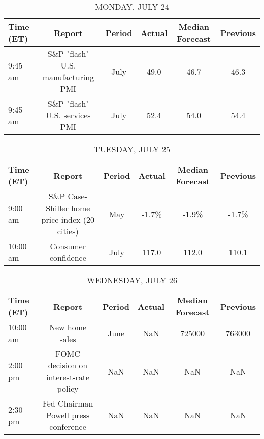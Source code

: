 \documentclass{article}%
\begin{document}
%
\normalsize%


\begin{table}[htbp]%
\caption{MONDAY, JULY 24}%
\centering%
\begin{adjustbox}{width=1\textwidth}%
\begin{tabular}{lccccc}
\toprule
Time (ET) &                             Report & Period & Actual & Median Forecast & Previous \\
\midrule
  9:45 am & S\&P "flash" U.S. manufacturing PMI &   July &   49.0 &            46.7 &     46.3 \\
  9:45 am &      S\&P "flash" U.S. services PMI &   July &   52.4 &            54.0 &     54.4 \\
\bottomrule
\end{tabular}
%
\end{adjustbox}%
\end{table}

%


\begin{table}[htbp]%
\caption{TUESDAY, JULY 25}%
\centering%
\begin{adjustbox}{width=1\textwidth}%
\begin{tabular}{lccccc}
\toprule
Time (ET) &                                        Report & Period & Actual & Median Forecast & Previous \\
\midrule
  9:00 am & S\&P Case-Shiller home price index (20 cities) &    May &  -1.7\% &           -1.9\% &    -1.7\% \\
 10:00 am &                           Consumer confidence &   July &  117.0 &           112.0 &    110.1 \\
\bottomrule
\end{tabular}
%
\end{adjustbox}%
\end{table}

%


\begin{table}[htbp]%
\caption{WEDNESDAY, JULY 26}%
\centering%
\begin{adjustbox}{width=1\textwidth}%
\begin{tabular}{lccccc}
\toprule
Time (ET) &                                Report & Period & Actual & Median Forecast & Previous \\
\midrule
 10:00 am &                        New home sales &   June &    NaN &          725000 &   763000 \\
  2:00 pm & FOMC decision on interest-rate policy &    NaN &    NaN &             NaN &      NaN \\
  2:30 pm &  Fed Chairman Powell press conference &    NaN &    NaN &             NaN &      NaN \\
\bottomrule
\end{tabular}
%
\end{adjustbox}%
\end{table}
\end{document}
